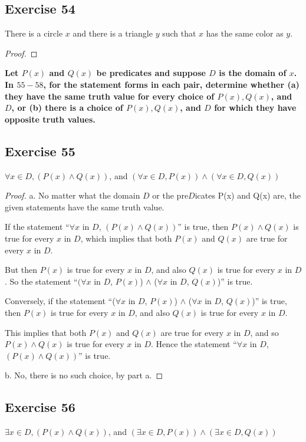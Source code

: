 \documentclass[14pt]{extarticle}
\newcommand{\fa}{\forall}
\newcommand{\te}{\exists}
\begin{document}
\subsection{Exercise 54}
There is a circle $x$ and there is a triangle $y$ such that $x$ has the same color as $y$.

\begin{proof}

\end{proof}

{\bf \color{cyan} Let $P(x)$ and $Q(x)$ be predicates and suppose $D$ is the domain of $x$. In $55-58$, for the statement forms in each pair, determine whether (a) they have the same truth value for every choice of $P(x), Q(x)$, and $D$, or (b) there is a choice of $P(x), Q(x)$, and $D$ for which they have opposite truth values.}

\subsection{Exercise 55}
$\fa x \in D, (P(x) \wedge Q(x))$, and $(\fa x \in D, P(x)) \wedge (\fa x \in D, Q(x))$

\begin{proof}
a. No matter what the domain $D$ or the pre$D$icates P(x) and Q(x) are, the given statements have the same truth value.

If the statement “$\fa x$ in $D$, $(P(x) \wedge Q(x))$” is true, then $P(x) \wedge Q(x)$ is true for every $x$ in $D$, which implies that both $P(x)$ and $Q(x)$ are true for every $x$ in $D$. 

But then $P(x)$ is true for every $x$ in $D$, and also $Q(x)$ is true for every $x$ in $D$. So the statement “$(\fa x$ in $D$, $P(x)$) $\wedge$ ($\fa x$ in $D$, $Q(x)$)” is true. 

Conversely, if the statement “($\fa x$ in $D$, $P(x)$) $\wedge$ ($\fa x$ in $D$, $Q(x)$)” is true, then $P(x)$ is true for every $x$ in $D$, and also $Q(x)$ is true for every $x$ in $D$. 

This implies that both $P(x)$ and $Q(x)$ are true for every $x$ in $D$, and so $P(x) \wedge Q(x)$ is true for every $x$ in $D$. Hence the statement “$\fa x$ in $D$, $(P(x) \wedge Q(x))$” is true.

b. No, there is no such choice, by part a.
\end{proof}

\subsection{Exercise 56}
$\te x \in D, (P(x) \wedge Q(x))$, and $(\te x \in D, P(x)) \wedge (\te x \in D, Q(x))$
\end{document}
